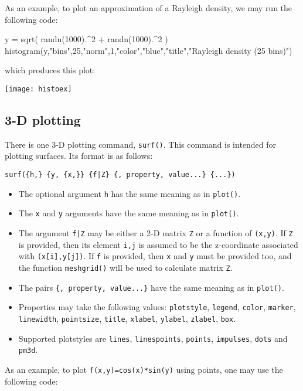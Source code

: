 \documentclass[11pt]{article}
\newcommand{\cmd}[1]{\texttt{#1}}
\begin{document}
As an example, to plot an approximation of a Rayleigh density, we may run the
following code:

\begin{juliacode}
y = sqrt( randn(1000).^2 + randn(1000).^2 )
histogram(y,"bins",25,"norm",1,"color","blue","title","Rayleigh density (25 bins)")
\end{juliacode}

which produces this plot:

\begin{center}
	\texttt{[image: histoex]}
\end{center}

\subsection{3-D plotting}

There is one 3-D plotting command, \cmd{surf()}. This command is intended for
plotting surfaces. Its format is as follows:

\cmd{surf(\{h,\} \{y, \{x,\}\} \{f|Z\} \{, property, value...\} \{...\})}

\begin{itemize}
	\item The optional argument \cmd{h} has the same meaning as in
		\cmd{plot()}.
	\item The \cmd{x} and \cmd{y} arguments have the same meaning as in
		\cmd{plot()}.
	\item The argument \cmd{f|Z} may be either a 2-D matrix \cmd{Z} or a
		function of \cmd{(x,y)}. If \cmd{Z} is provided, then its element
		\cmd{i,j} is assumed to be the z-coordinate associated with
		\cmd{(x[i],y[j])}. If \cmd{f} is provided, then \cmd{x} and \cmd{y} must
		be provided too, and the function \cmd{meshgrid()} will be used to
		calculate matrix \cmd{Z}.
	\item The pairs \cmd{\{, property, value...\}} have the same meaning as in
		\cmd{plot()}.
	\item Properties may take the following values: \cmd{plotstyle},
		\cmd{legend}, \cmd{color}, \cmd{marker}, \cmd{linewidth},
		\cmd{pointsize}, \cmd{title}, \cmd{xlabel}, \cmd{ylabel}, \cmd{zlabel},
		\cmd{box}.
	\item Supported plotstyles are \cmd{lines}, \cmd{linespoints},
		\cmd{points}, \cmd{impulses}, \cmd{dots} and \cmd{pm3d}.
\end{itemize}

As an example, to plot \cmd{f(x,y)=cos(x)*sin(y)} using points, one may use the
following code:
\end{document}

